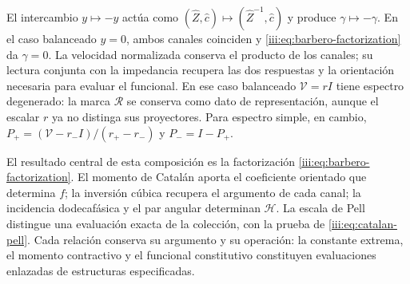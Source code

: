 El intercambio $y\mapsto-y$ actúa como
$(\widehat Z,\widehat c)\mapsto(\widehat Z^{-1},\widehat c)$ y
produce $\gamma\mapsto-\gamma$. En el caso balanceado $y=0$,
ambos canales coinciden y \eqref{iii:eq:barbero-factorization} da
$\gamma=0$. La velocidad normalizada conserva el producto de los
canales; su lectura conjunta con la impedancia recupera las dos
respuestas y la orientación necesaria para evaluar el funcional.
En ese caso balanceado $\mathcal V=rI$ tiene espectro degenerado:
la marca $\mathcal R$ se conserva como dato de representación, aunque
el escalar $r$ ya no distinga sus proyectores. Para espectro simple,
en cambio,
$P_+=(\mathcal V-r_-I)/(r_+-r_-)$ y $P_-=I-P_+$.

El resultado central de esta composición es la factorización
\eqref{iii:eq:barbero-factorization}. El momento de Catalán aporta el
coeficiente orientado que determina $f$; la inversión cúbica recupera
el argumento de cada canal; la incidencia dodecafásica y el par angular
determinan $\mathcal H$. La escala de Pell distingue una evaluación
exacta de la colección, con la prueba de
\eqref{iii:eq:catalan-pell}. Cada relación conserva su argumento y su
operación: la constante extrema, el momento contractivo y el funcional
constitutivo constituyen evaluaciones enlazadas de estructuras
especificadas.
